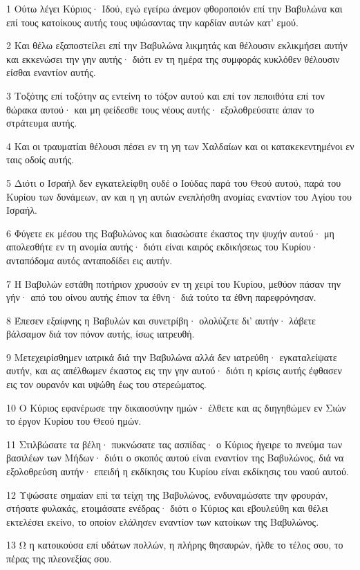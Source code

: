 \par 1 Ούτω λέγει Κύριος· Ιδού, εγώ εγείρω άνεμον φθοροποιόν επί την Βαβυλώνα και επί τους κατοίκους αυτής τους υψώσαντας την καρδίαν αυτών κατ' εμού.
\par 2 Και θέλω εξαποστείλει επί την Βαβυλώνα λικμητάς και θέλουσιν εκλικμήσει αυτήν και εκκενώσει την γην αυτής· διότι εν τη ημέρα της συμφοράς κυκλόθεν θέλουσιν είσθαι εναντίον αυτής.
\par 3 Τοξότης επί τοξότην ας εντείνη το τόξον αυτού και επί τον πεποιθότα επί τον θώρακα αυτού· και μη φείδεσθε τους νέους αυτής· εξολοθρεύσατε άπαν το στράτευμα αυτής.
\par 4 Και οι τραυματίαι θέλουσι πέσει εν τη γη των Χαλδαίων και οι κατακεκεντημένοι εν ταις οδοίς αυτής.
\par 5 Διότι ο Ισραήλ δεν εγκατελείφθη ουδέ ο Ιούδας παρά του Θεού αυτού, παρά του Κυρίου των δυνάμεων, αν και η γη αυτών ενεπλήσθη ανομίας εναντίον του Αγίου του Ισραήλ.
\par 6 Φύγετε εκ μέσου της Βαβυλώνος και διασώσατε έκαστος την ψυχήν αυτού· μη απολεσθήτε εν τη ανομία αυτής· διότι είναι καιρός εκδικήσεως του Κυρίου· ανταπόδομα αυτός ανταποδίδει εις αυτήν.
\par 7 Η Βαβυλών εστάθη ποτήριον χρυσούν εν τη χειρί του Κυρίου, μεθύον πάσαν την γήν· από του οίνου αυτής έπιον τα έθνη· διά τούτο τα έθνη παρεφρόνησαν.
\par 8 Έπεσεν εξαίφνης η Βαβυλών και συνετρίβη· ολολύζετε δι' αυτήν· λάβετε βάλσαμον διά τον πόνον αυτής, ίσως ιατρευθή.
\par 9 Μετεχειρίσθημεν ιατρικά διά την Βαβυλώνα αλλά δεν ιατρεύθη· εγκαταλείψατε αυτήν, και ας απέλθωμεν έκαστος εις την γην αυτού· διότι η κρίσις αυτής έφθασεν εις τον ουρανόν και υψώθη έως του στερεώματος.
\par 10 Ο Κύριος εφανέρωσε την δικαιοσύνην ημών· έλθετε και ας διηγηθώμεν εν Σιών το έργον Κυρίου του Θεού ημών.
\par 11 Στιλβώσατε τα βέλη· πυκνώσατε τας ασπίδας· ο Κύριος ήγειρε το πνεύμα των βασιλέων των Μήδων· διότι ο σκοπός αυτού είναι εναντίον της Βαβυλώνος, διά να εξολοθρεύση αυτήν· επειδή η εκδίκησις του Κυρίου είναι εκδίκησις του ναού αυτού.
\par 12 Υψώσατε σημαίαν επί τα τείχη της Βαβυλώνος, ενδυναμώσατε την φρουράν, στήσατε φυλακάς, ετοιμάσατε ενέδρας· διότι ο Κύριος και εβουλεύθη και θέλει εκτελέσει εκείνο, το οποίον ελάλησεν εναντίον των κατοίκων της Βαβυλώνος.
\par 13 Ω η κατοικούσα επί υδάτων πολλών, η πλήρης θησαυρών, ήλθε το τέλος σου, το πέρας της πλεονεξίας σου.
